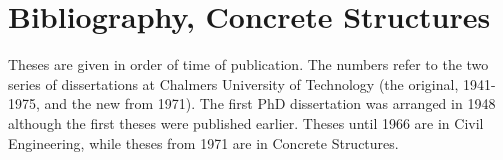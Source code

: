 \documentclass{article}
\begin{document}
\setlength\bibitemsep{8pt}
\part*{Bibliography, Concrete Structures}
Theses are given in order of time of publication. The numbers refer to the two series of dissertations at Chalmers University of Technology (the original, 1941-1975, and the new from 1971). The first PhD dissertation was arranged in 1948 although the first theses were published earlier. Theses until 1966 are in Civil Engineering, while theses from 1971 are in Concrete Structures.

\begin{refsection}[doctoral]
\nocite{*}
\printbibliography[resetnumbers=true,title={Doctoral Theses}]
\end{refsection}


\begin{refsection}[licentiate]
\nocite{*}
\printbibliography[resetnumbers=true,title={Licentiate Theses}]
\end{refsection}
\end{document}
